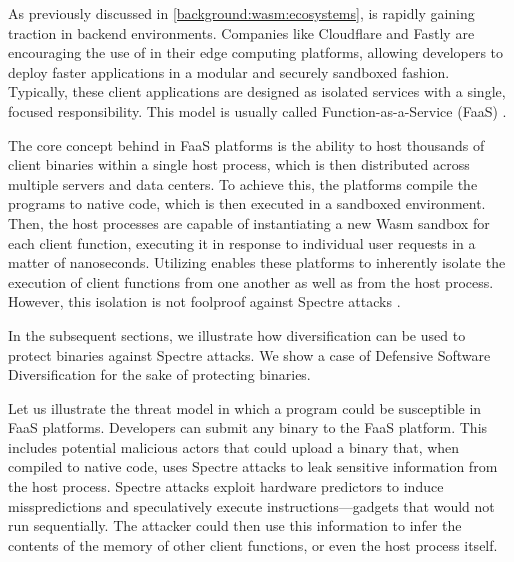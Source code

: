 


As previously discussed in \autoref{background:wasm:ecosystems}, \Wasm is rapidly gaining traction in backend environments. 
Companies like Cloudflare and Fastly are encouraging the use of \Wasm in their edge computing platforms, allowing developers to deploy faster applications in a modular and securely sandboxed fashion. 
Typically, these client \Wasm applications are designed as isolated services with a single, focused responsibility.
This model is usually called Function-as-a-Service (FaaS) \cite{pMendkiServerless, 1244493Jacobsson}.

The core concept behind \wasm in FaaS platforms is the ability to host thousands of client \Wasm binaries within a single host process, which is then distributed across multiple servers and data centers. 
To achieve this, the platforms compile the \wasm programs to native code, which is then executed in a sandboxed environment.
Then, the host processes are capable of instantiating a new Wasm sandbox for each client function, executing it in response to individual user requests in a matter of nanoseconds. 
Utilizing \Wasm enables these platforms to inherently isolate the execution of client functions from one another as well as from the host process.
However, this isolation is not foolproof against Spectre attacks \cite{Spectre,Narayan2021Swivel}.


In the subsequent sections, we illustrate how diversification can be used to protect \Wasm binaries against Spectre attacks.
We show a case of Defensive Software Diversification for the sake of protecting \Wasm binaries. 


Let us illustrate the threat model in which a \Wasm program could be susceptible in FaaS platforms.
Developers can submit any \Wasm binary to the FaaS platform.
This includes potential malicious actors that could upload a \wasm binary that, when compiled to native code, uses Spectre attacks to leak sensitive information from the host process.
Spectre attacks exploit hardware predictors to induce misspredictions and speculatively execute instructions—gadgets that would not run sequentially. 
The attacker could then use this information to infer the contents of the memory of other client functions, or even the host process itself.

